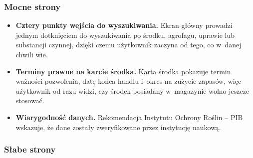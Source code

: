 \subsubsection{Mocne strony}

\begin{itemize}
    \item \textbf{Cztery punkty wejścia do wyszukiwania.}
    Ekran główny prowadzi jednym dotknięciem do wyszukiwania po środku,
    agrofagu, uprawie lub substancji czynnej, dzięki czemu użytkownik
    zaczyna od tego, co w~danej chwili wie.

    \item \textbf{Terminy prawne na karcie środka.}
    Karta środka pokazuje termin ważności pozwolenia, datę końca handlu
    i~okres na zużycie zapasów, więc użytkownik od razu widzi, czy środek
    posiadany w~magazynie wolno jeszcze stosować.

    \item \textbf{Wiarygodność danych.}
    Rekomendacja Instytutu Ochrony Roślin -- PIB wskazuje, że dane zostały
    zweryfikowane przez instytucję naukową.
\end{itemize}

\subsubsection{Słabe strony}

